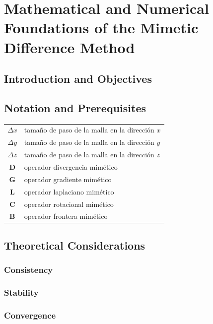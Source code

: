 \chapter{Mathematical and Numerical Foundations of the Mimetic Difference Method}

\section{Introduction and Objectives}

\section{Notation and Prerequisites}

\begin{table}[ht!]
	\centering
	\begin{tabular}{cl}
		$\Delta x$  & tamaño de paso de la malla en la dirección $x$ \\
		$\Delta y$  & tamaño de paso de la malla en la dirección $y$ \\
		$\Delta z$  & tamaño de paso de la malla en la dirección $z$ \\
		$\symbf{D}$ & operador divergencia mimético                  \\
		$\symbf{G}$ & operador gradiente mimético                    \\
		$\symbf{L}$ & operador laplaciano mimético                   \\
		$\symbf{C}$ & operador rotacional mimético                   \\
		$\symbf{B}$ & operador frontera mimético
	\end{tabular}
\end{table}

\section{Theoretical Considerations}

\subsection{Consistency}

\subsection{Stability}

\subsection{Convergence}

